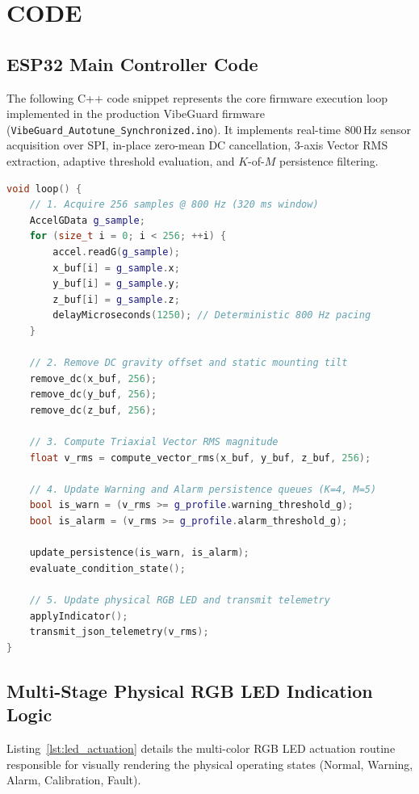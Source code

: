 \chapter{CODE}
\label{ch:code}

\section{ESP32 Main Controller Code}
\hspace{2em}The following C++ code snippet represents the core firmware execution loop implemented in the production VibeGuard firmware (\texttt{VibeGuard\_Autotune\_Synchronized.ino}). It implements real-time 800\,Hz sensor acquisition over SPI, in-place zero-mean DC cancellation, 3-axis Vector RMS extraction, adaptive threshold evaluation, and $K$-of-$M$ persistence filtering.

\begin{lstlisting}[language=C++, caption={VibeGuard Core Real-Time Acquisition and DSP Firmware Loop}, label={lst:vibeguard_core}]
void loop() {
    // 1. Acquire 256 samples @ 800 Hz (320 ms window)
    AccelGData g_sample;
    for (size_t i = 0; i < 256; ++i) {
        accel.readG(g_sample);
        x_buf[i] = g_sample.x;
        y_buf[i] = g_sample.y;
        z_buf[i] = g_sample.z;
        delayMicroseconds(1250); // Deterministic 800 Hz pacing
    }

    // 2. Remove DC gravity offset and static mounting tilt
    remove_dc(x_buf, 256);
    remove_dc(y_buf, 256);
    remove_dc(z_buf, 256);

    // 3. Compute Triaxial Vector RMS magnitude
    float v_rms = compute_vector_rms(x_buf, y_buf, z_buf, 256);

    // 4. Update Warning and Alarm persistence queues (K=4, M=5)
    bool is_warn = (v_rms >= g_profile.warning_threshold_g);
    bool is_alarm = (v_rms >= g_profile.alarm_threshold_g);
    
    update_persistence(is_warn, is_alarm);
    evaluate_condition_state();

    // 5. Update physical RGB LED and transmit telemetry
    applyIndicator();
    transmit_json_telemetry(v_rms);
}
\end{lstlisting}

\section{Multi-Stage Physical RGB LED Indication Logic}
\hspace{2em}Listing~\ref{lst:led_actuation} details the multi-color RGB LED actuation routine responsible for visually rendering the physical operating states (Normal, Warning, Alarm, Calibration, Fault).

